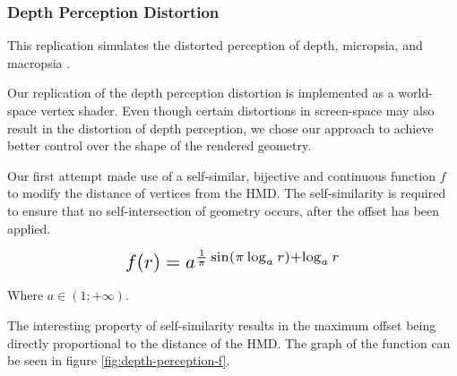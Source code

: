 \subsubsection{Depth Perception Distortion}
This replication simulates the distorted perception of depth, micropsia, and macropsia \autocites{fischer1970psilocybin}{dittrich1998standardized}{hill1969effects}{hill1973induction}.

Our replication of the depth perception distortion is implemented as a world-space vertex shader. Even though certain distortions in screen-space may also result in the distortion of depth perception, we chose our approach to achieve better control over the shape of the rendered geometry.

\label{sec:depth-first-attempt}
Our first attempt made use of a self-similar, bijective and continuous function $f$ to modify the distance of vertices from the \ac{HMD}. The self-similarity is required to ensure that no self-intersection of geometry occurs, after the offset has been applied.

\begin{equation}
    \scalebox{1.5}{
        $f(r) = a^{\frac{1}{\pi}\sin(\pi \log_a{r}) + \log_a{r}}$
    }
    \label{eq:depth-perception-f}
\end{equation}

Where $a \in (1; +\infty)$.

The interesting property of self-similarity results in the maximum offset being directly proportional to the distance of the \ac{HMD}. The graph of the function can be seen in figure \ref{fig:depth-perception-f}.

